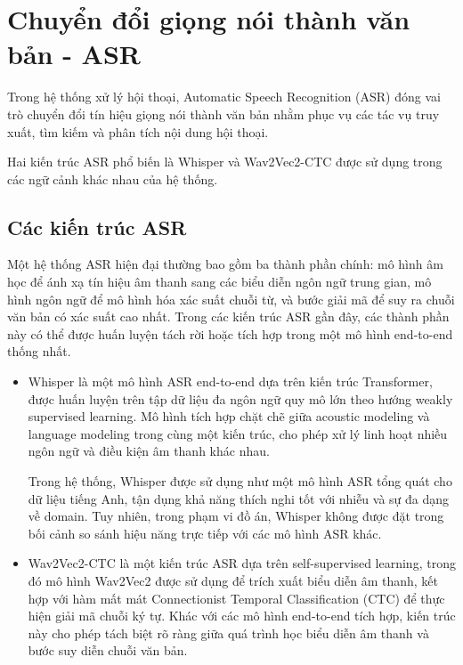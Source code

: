 \section{Chuyển đổi giọng nói thành văn bản - ASR}
Trong hệ thống xử lý hội thoại, Automatic Speech Recognition (ASR) đóng vai trò chuyển đổi tín hiệu giọng nói thành văn bản nhằm phục vụ các tác vụ truy xuất, tìm kiếm và phân tích nội dung hội thoại. 

Hai kiến trúc ASR phổ biến là Whisper và Wav2Vec2-CTC được sử dụng trong các ngữ cảnh khác nhau của hệ thống. 
\subsection{Các kiến trúc ASR}
Một hệ thống ASR hiện đại thường bao gồm ba thành phần chính: mô hình âm học để ánh xạ tín hiệu âm thanh sang các biểu diễn ngôn ngữ trung gian, mô hình ngôn ngữ để mô hình hóa xác suất chuỗi từ, và bước giải mã để suy ra chuỗi văn bản có xác suất cao nhất. Trong các kiến trúc ASR gần đây, các thành phần này có thể được huấn luyện tách rời hoặc tích hợp trong một mô hình end-to-end thống nhất.
\begin{itemize}[label={}]
    \item Whisper là một mô hình ASR end-to-end dựa trên kiến trúc Transformer, được huấn luyện trên tập dữ liệu đa ngôn ngữ quy mô lớn theo hướng weakly supervised learning. Mô hình tích hợp chặt chẽ giữa acoustic modeling và language modeling trong cùng một kiến trúc, cho phép xử lý linh hoạt nhiều ngôn ngữ và điều kiện âm thanh khác nhau. 
    
    Trong hệ thống, Whisper được sử dụng như một mô hình ASR tổng quát cho dữ liệu tiếng Anh, tận dụng khả năng thích nghi tốt với nhiễu và sự đa dạng về domain. Tuy nhiên, trong phạm vi đồ án, Whisper không được đặt trong bối cảnh so sánh hiệu năng trực tiếp với các mô hình ASR khác.
    \item Wav2Vec2-CTC là một kiến trúc ASR dựa trên self-supervised learning, trong đó mô hình Wav2Vec2 được sử dụng để trích xuất biểu diễn âm thanh, kết hợp với hàm mất mát Connectionist Temporal Classification (CTC) để thực hiện giải mã chuỗi ký tự. Khác với các mô hình end-to-end tích hợp, kiến trúc này cho phép tách biệt rõ ràng giữa quá trình học biểu diễn âm thanh và bước suy diễn chuỗi văn bản.
\end{itemize}

